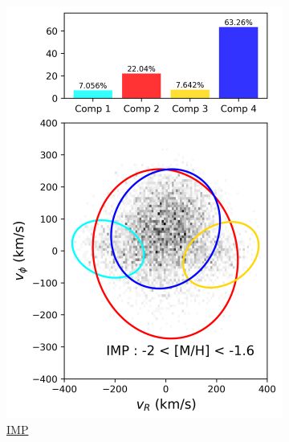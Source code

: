 \documentclass[a4paper,10pt]{article}
\begin{document}
\begin{multicols}{2}
\begin{figure}[H]
\begin{subfigure}[t]{0.24\linewidth}
    \includegraphics[width=\linewidth]{../figures/gmm_IMP.png}
    \caption{\href{https://raw.githack.com/raunaq-rai/Disentangling-the-Milky-Way-using-GMM/main/figures/IMP\_\_-2\%5BM\_H\%5D-1.6.html}{IMP}}
    \label{fig:gmm_imp}
  \end{subfigure}\hfill
  \begin{subfigure}[t]{0.24\linewidth}

\end{subfigure}
\end{figure}
\end{multicols}
\end{document}
